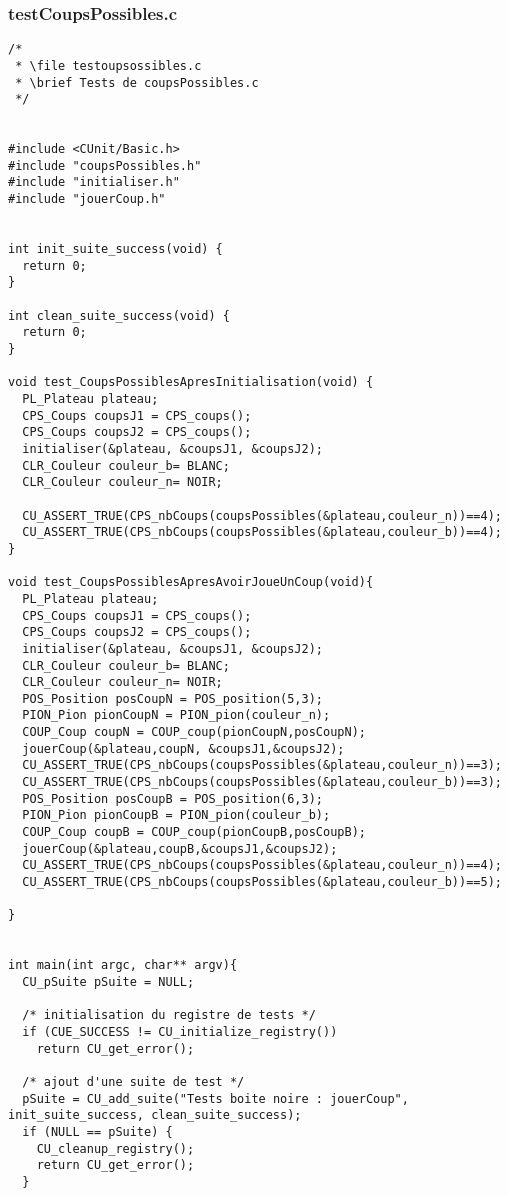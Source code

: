 \subsubsection{testCoupsPossibles.c}
\begin{lstlisting}
/*
 * \file testoupsossibles.c
 * \brief Tests de coupsPossibles.c
 */


#include <CUnit/Basic.h>
#include "coupsPossibles.h"
#include "initialiser.h"
#include "jouerCoup.h"


int init_suite_success(void) {
  return 0;
}

int clean_suite_success(void) {
  return 0;
}

void test_CoupsPossiblesApresInitialisation(void) {
  PL_Plateau plateau;
  CPS_Coups coupsJ1 = CPS_coups();
  CPS_Coups coupsJ2 = CPS_coups();
  initialiser(&plateau, &coupsJ1, &coupsJ2);
  CLR_Couleur couleur_b= BLANC;
  CLR_Couleur couleur_n= NOIR;

  CU_ASSERT_TRUE(CPS_nbCoups(coupsPossibles(&plateau,couleur_n))==4);
  CU_ASSERT_TRUE(CPS_nbCoups(coupsPossibles(&plateau,couleur_b))==4);
}

void test_CoupsPossiblesApresAvoirJoueUnCoup(void){
  PL_Plateau plateau;
  CPS_Coups coupsJ1 = CPS_coups();
  CPS_Coups coupsJ2 = CPS_coups();
  initialiser(&plateau, &coupsJ1, &coupsJ2);
  CLR_Couleur couleur_b= BLANC;
  CLR_Couleur couleur_n= NOIR;
  POS_Position posCoupN = POS_position(5,3);
  PION_Pion pionCoupN = PION_pion(couleur_n);
  COUP_Coup coupN = COUP_coup(pionCoupN,posCoupN);
  jouerCoup(&plateau,coupN, &coupsJ1,&coupsJ2);
  CU_ASSERT_TRUE(CPS_nbCoups(coupsPossibles(&plateau,couleur_n))==3);
  CU_ASSERT_TRUE(CPS_nbCoups(coupsPossibles(&plateau,couleur_b))==3);
  POS_Position posCoupB = POS_position(6,3);
  PION_Pion pionCoupB = PION_pion(couleur_b);
  COUP_Coup coupB = COUP_coup(pionCoupB,posCoupB);
  jouerCoup(&plateau,coupB,&coupsJ1,&coupsJ2);
  CU_ASSERT_TRUE(CPS_nbCoups(coupsPossibles(&plateau,couleur_n))==4);
  CU_ASSERT_TRUE(CPS_nbCoups(coupsPossibles(&plateau,couleur_b))==5);
 
}


int main(int argc, char** argv){
  CU_pSuite pSuite = NULL;

  /* initialisation du registre de tests */
  if (CUE_SUCCESS != CU_initialize_registry())
    return CU_get_error();

  /* ajout d'une suite de test */
  pSuite = CU_add_suite("Tests boite noire : jouerCoup", init_suite_success, clean_suite_success);
  if (NULL == pSuite) {
    CU_cleanup_registry();
    return CU_get_error();
  }


\end{lstlisting}
